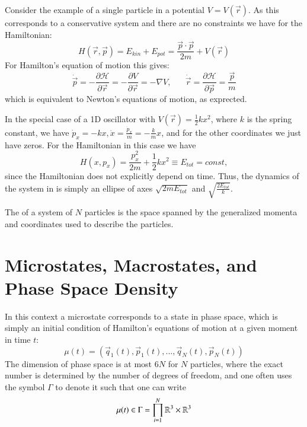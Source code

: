 \documentclass[12pt, a4paper, oneside, openright, titlepage]{book}
\begin{document}
\begin{eg}
    Consider the example of a single particle in a potential $V = V(\vec{r})$. As this corresponds to a conservative system and there are no constraints we have for the Hamiltonian: \begin{equation*}
        H(\vec{r},\vec{p}) = E_{kin} + E_{pot} = \frac{\vec{p}\cdot \vec{p}}{2m} + V(\vec{r})
    \end{equation*}
    For Hamilton's equation of motion this gives: \begin{equation*}
        \dot{\vec{p}} = -\frac{\partial \mathcal{H}}{\partial \vec{r}} = -\frac{\partial V}{\partial \vec{r}} = -\nabla V,\;\;\;\;\;\;\dot{\vec{r}} = \frac{\partial \mathcal{H}}{\partial \vec{p}} = \frac{\vec{p}}{m}
    \end{equation*}
    which is equivalent to Newton's equations of motion, as exprected.

    In the special case of a 1D oscillator with $V(\vec{r}) = \frac{1}{2}kx^2$, where $k$ is the spring constant, we have $\dot{p}_x = -kx, \ddot{x} = \frac{\dot{p}_x}{m} = -\frac{k}{m}x$, and for the other coordinates we just have zeros. For the Hamiltonian in this case we have \begin{equation*}
        H(x,p_x) = \frac{p_x^2}{2m} + \frac{1}{2}kx^2 \equiv E_{tot} = const,
    \end{equation*}
    since the Hamiltonian does not explicitly depend on time. Thus, the dynamics of the system in  is simply an ellipse of axes $\sqrt{2mE_{tot}}$ and $\sqrt{\frac{2E_{tot}}{k}}$.
\end{eg}

\begin{defn}
    The  of a system of $N$ particles is the space spanned by the generalized momenta and coordinates used to describe the particles.
\end{defn}



\section{Microstates, Macrostates, and Phase Space Density}

In this context a microstate corresponds to a state in phase space, which is simply an initial condition of Hamilton's equations of motion at a given moment in time $t$: \begin{equation*}
    \mu(t) = (\vec{q}_1(t),\vec{p}_1(t),...,\vec{q}_N(t),\vec{p}_N(t))
\end{equation*}
The dimension of phase space is at most $6N$ for $N$ particles, where the exact number is determined by the number of degrees of freedom, and one often uses the symbol $\Gamma$ to denote it such that one can write \begin{equation*}
    \mu(t) \in \Gamma = \prod_{i=1}^N\mathbb R^3\times \mathbb R^3
\end{equation*}
\end{document}
